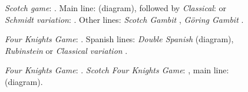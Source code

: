 \begin{figure}[H]
\begin{minipage}[b]{.246\linewidth}
\begin{framed}
\raggedright
\newgame
\emph{Scotch game}: .
Main line:  (diagram), followed by \emph{Classical}:  or \emph{Schmidt variation}: .
Other lines: \emph{Scotch Gambit} , \emph{Göring Gambit} .
\begin{center}
\scalebox{0.7}{\showboard}
\end{center}
\end{framed}
\end{minipage}
\begin{minipage}[b]{.246\linewidth}
\begin{framed}
\raggedright
\newgame
\emph{Four Knights Game}: .
Spanish lines: \emph{Double Spanish}  (diagram), \emph{Rubinstein}  or \emph{Classical variation} .\begin{center}
\scalebox{0.7}{\showboard}
\end{center}
\end{framed}
\end{minipage}
\begin{minipage}[b]{.246\linewidth}
\begin{framed}
\raggedright
\newgame
\emph{Four Knights Game}: .
\emph{Scotch Four Knights Game}: , main line:  (diagram).\begin{center}
\scalebox{0.7}{\showboard}
\end{center}
\end{framed}
\end{minipage}
\end{figure}


